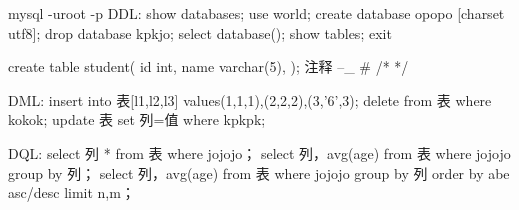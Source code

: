 mysql -uroot -p  %
DDL:
show databases;    
use world;
create database opopo [charset utf8];
drop database kpkjo;
select database();  %
show tables;
exit 

create table student(
    id int,
    name varchar(5),
);
注释  --_
      # 
      /*    */

DML:
insert into 表[l1,l2,l3] values(1,1,1),(2,2,2),(3,'6',3);
delete from 表 where kokok;
update 表 set 列=值 where kpkpk;

DQL:
select 列 * from 表 where jojojo；
select 列，avg(age) from 表 where jojojo group by 列；   %
select 列，avg(age) from 表 where jojojo group by 列 order by abe asc/desc limit n,m； 

